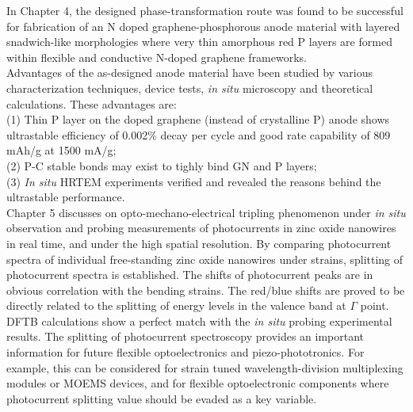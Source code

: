 In Chapter 4, the designed phase-transformation route was found to be successful for fabrication of an N doped graphene-phosphorous anode material with layered snadwich-like morphologies where very thin amorphous red P layers are formed within flexible and conductive N-doped graphene frameworks.\\
Advantages of the as-designed anode material have been studied by various characterization techniques, device tests, {\it in situ} microscopy and theoretical calculations. 
These advantages are: \\
(1) Thin P layer on the doped graphene (instead of crystalline P) anode shows ultrastable efficiency of 0.002\% decay per cycle and good rate capability of 809 mAh/g at 1500 mA/g; \\
(2) P-C stable bonds may exist to tighly bind GN and P layers; \\
(3) {\it In situ} HRTEM experiments verified and revealed the reasons behind the ultrastable performance.\\

Chapter 5 discusses on opto-mechano-electrical tripling phenomenon under {\it in situ} observation and probing measurements of photocurrents in zinc oxide nanowires in real time, and under the high spatial resolution. 
By comparing photocurrent spectra of individual free-standing zinc oxide nanowires under strains, splitting of photocurrent spectra is established. 
The shifts of photocurrent peaks are in obvious correlation with the bending strains. 
The red/blue shifts are proved to be directly related to the splitting of energy levels in the valence band at $\Gamma$ point. 
DFTB calculations show a perfect match with the {\it in situ} probing experimental results. 
The splitting of photocurrent spectroscopy provides an important information for future flexible optoelectronics and piezo-phototronics. 
For example, this can be considered for strain tuned wavelength-division multiplexing modules or MOEMS devices, and for flexible optoelectronic components where photocurrent splitting value should be evaded as a key variable. \\

